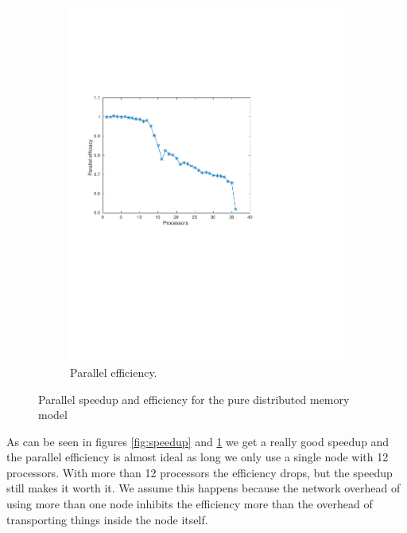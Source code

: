 \begin{figure}
\begin{subfigure}[b]{0.45\textwidth}
			\includegraphics[width=\textwidth]{./figures/efficiacy}
			\caption{Parallel efficiency.}
			\label{fig:efficiacy}
        \end{subfigure}%
        \caption{Parallel speedup and efficiency for the pure distributed memory model}
        \label{fig:analysis}
\end{figure}

As can be seen in figures \ref{fig:speedup} and \ref{fig:efficiacy} we get a really good speedup and the parallel efficiency is almost ideal as long we only use a single node with 12 processors. With more than 12 processors the efficiency drops, but the speedup still makes it worth it. We assume this happens because the network overhead of using more than one node inhibits the efficiency more than the overhead of transporting things inside the node itself.


